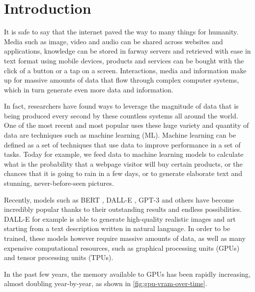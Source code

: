 
\chapter{Introduction}\label{chapter:introduction}

It is safe to say that the internet paved the way to many things for humanity.
Media such as image, video and audio can be shared across websites and applications, knowledge can be stored in farway servers and retrieved with ease in text format using mobile devices, products and services can be bought with the click of a button or a tap on a screen.
Interactions, media and information make up for massive amounts of data that flow through complex computer systems, which in turn generate even more data and information.

In fact, researchers have found ways to leverage the magnitude of data that is being produced every second by these countless systems all around the world.
One of the most recent and most popular uses these huge variety and quantity of data are techniques such as machine learning (ML).
Machine learning can be defined as a set of techniques that use data to improve performance in a set of tasks.
Today for example, we feed data to machine learning models to calculate what is the probability that a webpage visitor will buy certain products, or the chances that it is going to rain in a few days, or to generate elaborate text and stunning, never-before-seen pictures.

Recently, models such as BERT \cite{devlin2018bert}, DALL-E \cite{ramesh2021zero}, GPT-3 \cite{brown2020gpt3} and others have become incredibly popular thanks to their outstanding results and endless possibilities.
DALL-E for example is able to generate high-quality realistic images and art starting from a text description written in natural language.
In order to be trained, these models however require massive amounts of data, as well as many expensive computational resources, such as graphical processing units (GPUs) and tensor processing units (TPUs).

In the past few years, the memory available to GPUs has been rapidly increasing, almost doubling year-by-year, as shown in \autoref{fig:gpu-vram-over-time}.

